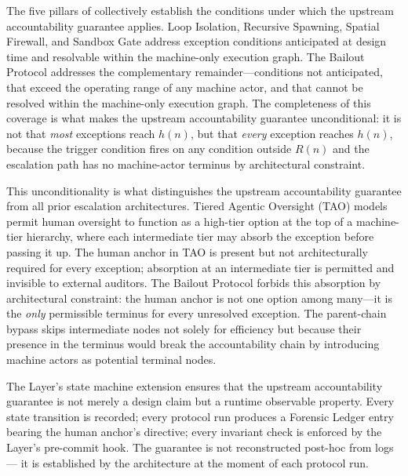 The five pillars of \bxthree{} collectively establish the conditions under
which the upstream accountability guarantee applies.  Loop Isolation, Recursive
Spawning, Spatial Firewall, and Sandbox Gate address exception conditions
anticipated at design time and resolvable within the machine-only execution
graph.  The Bailout Protocol addresses the complementary remainder---conditions
not anticipated, that exceed the operating range of any machine actor, and that
cannot be resolved within the machine-only execution graph.  The completeness of
this coverage is what makes the upstream accountability guarantee unconditional:
it is not that \emph{most} exceptions reach $h(n)$, but that \emph{every}
exception reaches $h(n)$, because the trigger condition fires on any condition
outside $R(n)$ and the escalation path has no machine-actor terminus by
architectural constraint.

This unconditionality is what distinguishes the \bxthree{} upstream
accountability guarantee from all prior escalation architectures.  Tiered
Agentic Oversight (TAO) models permit human oversight to function as a
high-tier option at the top of a machine-tier hierarchy, where each intermediate
tier may absorb the exception before passing it up.  The human anchor in TAO is
present but not architecturally required for every exception; absorption at an
intermediate tier is permitted and invisible to external auditors.  The Bailout
Protocol forbids this absorption by architectural constraint: the human anchor
is not one option among many---it is the \emph{only} permissible terminus for
every unresolved exception.  The parent-chain bypass skips intermediate nodes
not solely for efficiency but because their presence in the terminus would break
the accountability chain by introducing machine actors as potential terminal
nodes.

The \fact{} Layer's state machine extension ensures that the upstream
accountability guarantee is not merely a design claim but a runtime observable
property.  Every state transition is recorded; every protocol run produces a
Forensic Ledger entry bearing the human anchor's directive; every invariant
check is enforced by the \fact{} Layer's pre-commit hook.  The guarantee is not
reconstructed post-hoc from logs --- it is established by the architecture at
the moment of each protocol run.